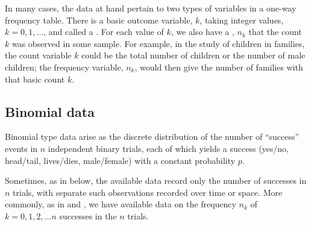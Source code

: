 \documentclass[11pt]{book}\usepackage[]{graphicx}\usepackage[]{color}
\begin{document}
In many cases, the data at hand pertain to two types of variables in a one-way
frequency table. There is a basic outcome variable, $k$, taking integer values,
$k = 0, 1, \dots$, and called a .  For each value of $k$, we also have
a , $n_k$ that the count $k$ was observed in some sample.
For example, in the study of children in families, the count variable
$k$ could be the total number of children or the number of male children;
the frequency variable, $n_k$, would then give the number of families with that
basic count $k$.

\subsection{Binomial data}\label{sec:binom-data}
Binomial type data arise as the discrete distribution of the number of
``success'' events in $n$ independent binary trials, each of which 
yields a success (yes/no, head/tail, lives/dies, male/female) with a constant probability $p$. 

Sometimes, as in 
below, the available data record only the number of successes
in $n$ trials, with separate such observations recorded over
time or space.  More commonly, as in 
and ,
we have available data on the frequency $n_k$
of $k = 0, 1, 2, \dots n$ successes in the $n$ trials.
\end{document}
